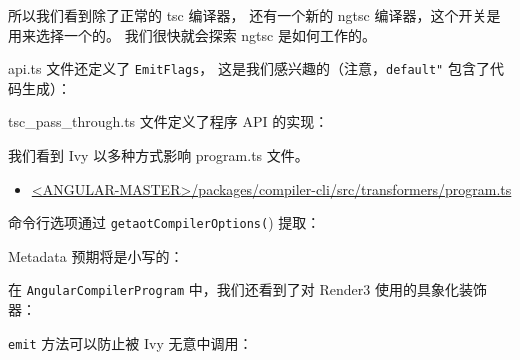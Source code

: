 所以我们看到除了正常的 tsc 编译器，
还有一个新的 ngtsc 编译器，这个开关是用来选择一个的。
我们很快就会探索 ngtsc 是如何工作的。


api.ts 文件还定义了 \texttt{EmitFlags}，
这是我们感兴趣的（注意，\texttt{default"} 包含了代码生成）：




tsc\_pass\_through.ts 文件定义了程序 API 的实现：




我们看到 Ivy 以多种方式影响 program.ts 文件。

\begin{itemize}
  \item \href{https://github.com/angular/angular/blob/master/packages/compiler-cli/src/transformers/program.ts}
        {<ANGULAR-MASTER>/packages/compiler-cli/src/transformers/program.ts}
\end{itemize}


命令行选项通过 \texttt{getaotCompilerOptions(}) 提取：




Metadata 预期将是小写的：




在 \texttt{AngularCompilerProgram} 中，我们还看到了对 Render3 使用的具象化装饰器：




\texttt{emit} 方法可以防止被 Ivy 无意中调用：

